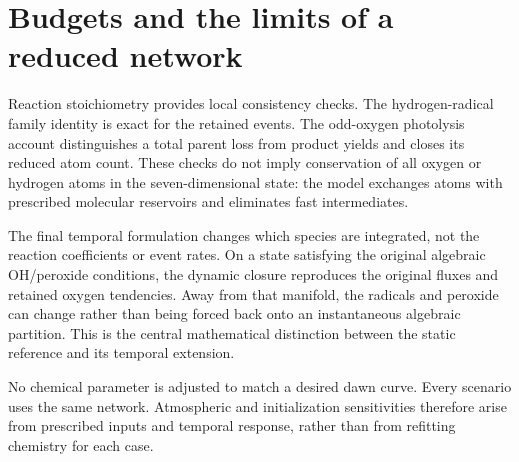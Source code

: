 \section{Budgets and the limits of a reduced network}
Reaction stoichiometry provides local consistency checks. The hydrogen-radical family identity is exact for the retained events. The odd-oxygen photolysis account distinguishes a total parent loss from product yields and closes its reduced atom count. These checks do not imply conservation of all oxygen or hydrogen atoms in the seven-dimensional state: the model exchanges atoms with prescribed molecular reservoirs and eliminates fast intermediates.

The final temporal formulation changes which species are integrated, not the reaction coefficients or event rates. On a state satisfying the original algebraic OH/peroxide conditions, the dynamic closure reproduces the original fluxes and retained oxygen tendencies. Away from that manifold, the radicals and peroxide can change rather than being forced back onto an instantaneous algebraic partition. This is the central mathematical distinction between the static reference and its temporal extension.

No chemical parameter is adjusted to match a desired dawn curve. Every scenario uses the same network. Atmospheric and initialization sensitivities therefore arise from prescribed inputs and temporal response, rather than from refitting chemistry for each case.
